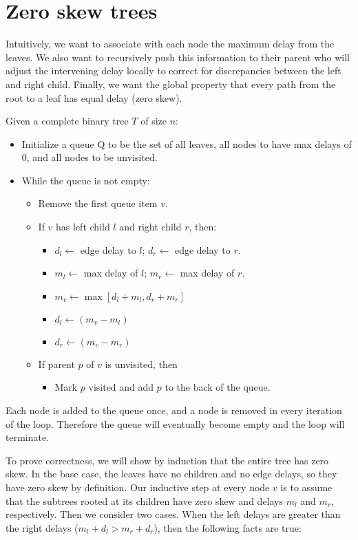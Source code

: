 \documentclass[12pt]{article}
\begin{document}
\pagebreak

\section{Zero skew trees}

Intuitively, we want to associate with each node the maximum delay from the
leaves. We also want to recursively push this information to their parent
who will adjust the intervening delay locally to correct for
discrepancies between the left and right child. Finally, we want the global
property that every path from the root to a leaf has equal delay (zero skew).

Given a complete binary tree $T$ of size $n$:

\begin{itemize}
\item Initialize a queue Q to be the set of all leaves, all nodes to have max delays of 0, and all nodes to be unvisited.
\item While the queue is not empty:
\begin{itemize}
\item Remove the first queue item $v$.
\item If $v$ has left child $l$ and right child $r$, then:
\begin{itemize}
\item $d_l \gets$ edge delay to $l$; $d_r \gets$ edge delay to $r$.
\item $m_l \gets$ max delay of $l$; $m_r \gets$ max delay of $r$.
\item $m_v \gets \max{\left[d_l+m_l,d_r+m_r\right]}$
\item $d_l \gets (m_v - m_l)$
\item $d_r \gets (m_v - m_r)$
\end{itemize}
\item If parent $p$ of $v$ is unvisited, then
\begin{itemize}
\item Mark $p$ visited and add $p$ to the back of the queue.
\end{itemize}
\end{itemize}
\end{itemize}

Each node is added to the queue once, and a node is removed in every
iteration of the loop. Therefore the queue will eventually become empty
and the loop will terminate.

To prove correctness, we will show by induction that the
entire tree has zero skew.
In the base case, the
leaves have no children and no edge delays, so they have zero skew
by definition.
Our inductive step
at every node $v$ is to assume that the subtrees rooted at its children have
zero skew and delays $m_l$ and $m_r$, respectively.
Then we consider two cases. When the left delays are greater
than the right delays ($m_l + d_l > m_r + d_r$),
then the following facts are true:
\end{document}
